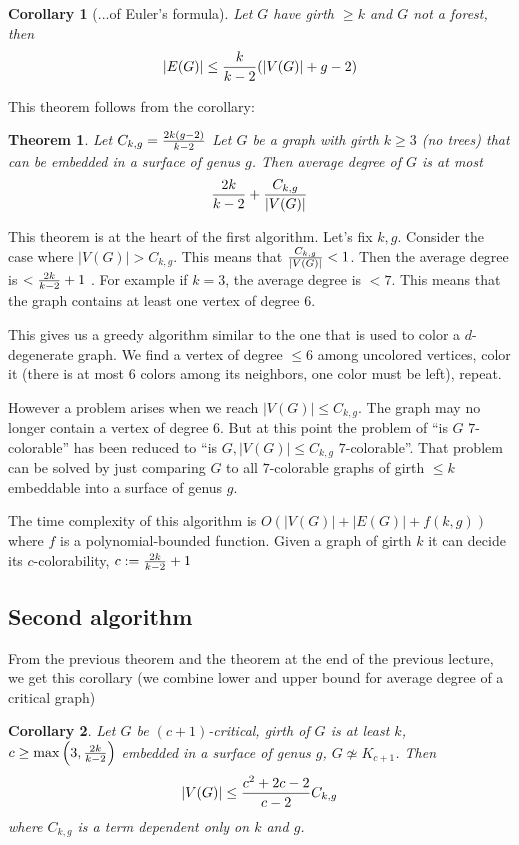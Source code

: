 \documentclass{article}
\newtheorem*{theorem}{Theorem}
\newtheorem*{corollary}{Corollary}
\begin{document}
\begin{corollary}[...of Euler's formula]
	Let $G$ have girth $\ge k$ and $G$ not a forest, then
	$$ |E(G)| \le {k\over{k-2}}(|V(G)| + g - 2)$$
\end{corollary}

This theorem follows from the corollary:

\begin{theorem}
	Let $C_{k,g} = {{2k(g-2)}\over{k-2}}$ Let $G$ be a graph with girth $k
	\ge 3$ (no trees) that can be embedded in a surface of genus $g$. Then
	average degree of $G$ is at most $$ {{2k}\over{k-2}} +
	{C_{k,g}\over{|V(G)|}}$$
\end{theorem}

\noindent
This theorem is at the heart of the first algorithm. Let's fix $k,g$. Consider
the case where $|V(G)| > C_{k,g}$. This means that ${C_{k,g}\over{|V(G)|}} <
1$. Then the average degree is $< {{2k}\over{k-2}} + 1$ . For example if $k =
3$, the average degree is $< 7$. This means that the graph contains at least
one vertex of degree $6$.

This gives us a greedy algorithm similar to the one that is used to color a
$d$-degenerate graph. We find a vertex of degree $\le 6$ among uncolored
vertices, color it (there is at most $6$ colors among its neighbors, one color
must be left), repeat.

However a problem arises when we reach $|V(G)| \le C_{k,g}$. The graph may no
longer contain a vertex of degree $6$. But at this point the problem of
\enquote{is $G$ $7$-colorable} has been reduced to \enquote{is $G, |V(G)| \le
C_{k,g}$ $7$-colorable}. That problem can be solved by just comparing $G$ to
all $7$-colorable graphs of girth $\le k$ embeddable into a surface of genus
$g$.

The time complexity of this algorithm is $O(|V(G)| + |E(G)| + f(k, g))$ where
$f$ is a polynomial-bounded function. Given a graph of girth $k$ it can decide
its $c$-colorability, $c := {{2k}\over{k-2}} + 1$

\subsection*{Second algorithm}

From the previous theorem and the theorem at the end of the previous lecture,
we get this corollary (we combine lower and upper bound for average degree of a
critical graph)

\begin{corollary}
	Let $G$ be $(c + 1)$-critical, girth of $G$ is at least $k$, $c \ge
	\max \left ( 3, {{2k}\over{k-2}} \right )$ embedded in a surface of
	genus $g$, $G \not \simeq K_{c+1}$. Then $$ |V(G)| \le {{c^2 + 2c -
	2}\over{c - 2}} C_{k,g} $$ where $C_{k,g}$ is a term dependent only on
	$k$ and $g$.
\end{corollary}
\end{document}
